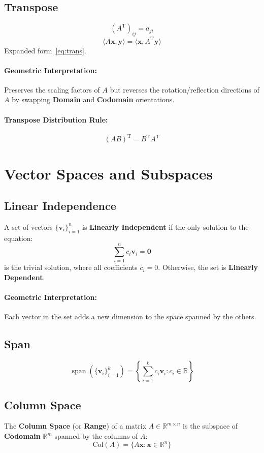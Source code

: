 \documentclass{article}
\begin{document}
\subsection{Transpose}
\[
    (A^{\mathrm{T}})_{ij} = a_{ji}
\]
\[
    \langle A\mathbf{x}, \mathbf{y} \rangle = \langle \mathbf{x}, A^{\mathrm{T}}\mathbf{y} \rangle
\]
Expanded form~\ref{eq:trans}.
\paragraph{Geometric Interpretation:} Preserves the scaling factors of $A$ but reverses the rotation/reflection directions of $A$ by swapping \textbf{Domain} and \textbf{Codomain} orientations.
\paragraph{Transpose Distribution Rule:}
\[
    (AB)^{\mathrm{T}} = B^{\mathrm{T}} A^{\mathrm{T}}
\]


\newpage
\section{Vector Spaces and Subspaces}

\subsection{Linear Independence}
A set of vectors $\{\mathbf{v}_i\}_{i=1}^n$ is \textbf{Linearly Independent} if the only solution to the equation:
\[
    \sum_{i=1}^{n} c_i \mathbf{v}_i = \mathbf{0}
\]
is the trivial solution, where all coefficients $c_i = 0$. Otherwise, the set is \textbf{Linearly Dependent}.
\paragraph{Geometric Interpretation:} Each vector in the set adds a new dimension to the space spanned by the others.

\subsection{Span}

\[
    \operatorname{span}(\{\mathbf{v}_i\}_{i=1}^{k}) = \left\{ \sum_{i=1}^{k} c_i \mathbf{v}_i : c_i \in \mathbb{R} \right\}
\]

\subsection{Column Space}
The \textbf{Column Space} (or \textbf{Range}) of a matrix $A \in \mathbb{R}^{m \times n}$ is the subspace of \textbf{Codomain} $\mathbb{R}^m$ spanned by the columns of $A$:
\[
    \text{Col}(A) = \{ A\mathbf{x} : \mathbf{x} \in \mathbb{R}^n \}
\]
\end{document}
